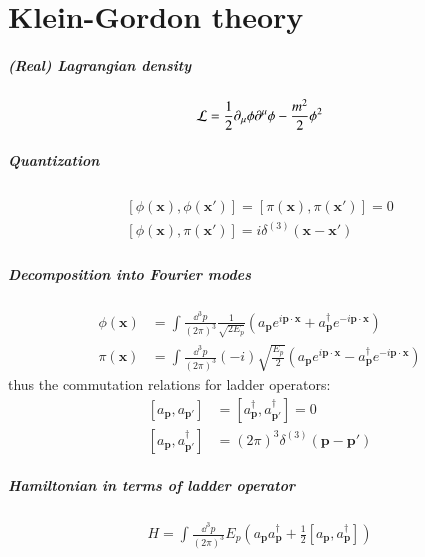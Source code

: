 \chapter{Klein-Gordon theory}
\setcounter{chapter}{2}
\paragraph{(Real) Lagrangian density}
\begin{align}
	\mathcal{L} = \frac{1}{2} \partial_\mu \phi \partial^\mu \phi - \frac{m^2}{2} \phi^2
\end{align}
\paragraph{Quantization}
\begin{align}
	\begin{split}
		\left[ \phi(\pmb{x}), \phi(\pmb{x}') \right] = \left[ \pi(\pmb{x}), \pi(\pmb{x}') \right] = 0 \\
		\left[ \phi(\pmb{x}), \pi(\pmb{x}') \right] = i \delta^{(3)}(\pmb{x} - \pmb{x}')
	\end{split}
\end{align}
\paragraph{Decomposition into Fourier modes}
\begin{align}
	\phi({\pmb{x}}) &= \int \frac{\dd^3 p}{(2\pi)^3}\frac{1}{\sqrt{2E_p}} \left( a_{\pmb{p}} e^{i\pmb{p}\cdot\pmb{x}} + a_{\pmb{p}}^\dagger e^{-i \pmb{p} \cdot \pmb{x}} \right) \\
	\pi({\pmb{x}}) &= \int \frac{\dd^3 p}{(2\pi)^3}(-i)\sqrt{\frac{E_p}{2}} \left( a_{\pmb{p}} e^{i\pmb{p}\cdot\pmb{x}} - a_{\pmb{p}}^\dagger e^{-i \pmb{p} \cdot \pmb{x}} \right)
\end{align}
thus the commutation relations for ladder operators:
\begin{align}
	\left[ a_{\pmb{p}}, a_{\pmb{p}'} \right] &= \left[ a^\dagger_{\pmb{p}}, a^\dagger_{\pmb{p}'} \right] = 0 \\
	\left[ a_{\pmb{p}}, a^\dagger_{\pmb{p}'} \right] &= (2\pi)^3 \delta^{(3)}(\pmb{p}-\pmb{p}')
\end{align}
\paragraph{Hamiltonian in terms of ladder operator}
\begin{align}
	H = \int \frac{\dd^3 p}{(2\pi)^3} E_p \left( a_{\pmb{p}} a_{\pmb{p}} ^\dagger + \frac{1}{2} \left[ a_{\pmb{p}}, a_{\pmb{p}}^\dagger \right] \right)
\end{align}
